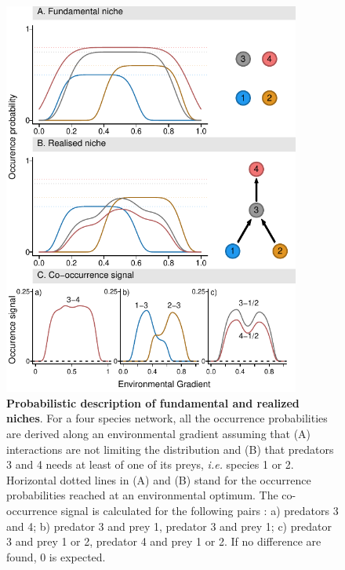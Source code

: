\begin{figure}
\centering
\includegraphics[width=0.87000\textwidth]{chapitre3/figConcept.pdf}
\caption{\textbf{Probabilistic description of fundamental and realized
niches}. For a four species network, all the occurrence probabilities
are derived along an environmental gradient assuming that (A)
interactions are not limiting the distribution and (B) that predators 3
and 4 needs at least of one of its preys, \emph{i.e.} species 1 or 2.
Horizontal dotted lines in (A) and (B) stand for the occurrence
probabilities reached at an environmental optimum. The co-occurrence
signal is calculated for the following pairs : a) predators 3 and 4; b)
predator 3 and prey 1, predator 3 and prey 1; c) predator 3 and prey 1
or 2, predator 4 and prey 1 or 2. If no difference are found, 0 is
expected.\label{fig:box1}}
\end{figure}

\newpage

